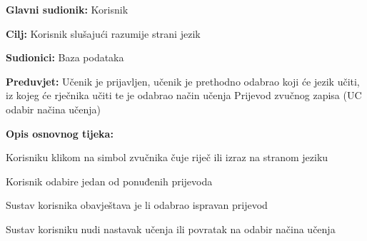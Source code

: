 \noindent {}
\begin{packed_item}

	\item \textbf{Glavni sudionik: } Korisnik
	\item \textbf{Cilj: } Korisnik slušajući razumije strani jezik
	\item \textbf{Sudionici: } Baza podataka
	\item \textbf{Preduvjet: } Učenik je prijavljen, učenik je prethodno odabrao koji će jezik učiti, iz kojeg će rječnika učiti te je odabrao način učenja Prijevod zvučnog zapisa (UC odabir načina učenja)
	\item  \textbf{Opis osnovnog tijeka:} 
	
	\item[] \begin{packed_enum}

		\item Korisniku klikom na simbol zvučnika čuje riječ ili izraz na stranom jeziku
		\item Korisnik odabire jedan od ponuđenih prijevoda 
		\item Sustav korisnika obavještava je li odabrao ispravan prijevod
		\item Sustav korisniku nudi nastavak učenja ili povratak na odabir načina učenja

	\end{packed_enum}

\end{packed_item}


